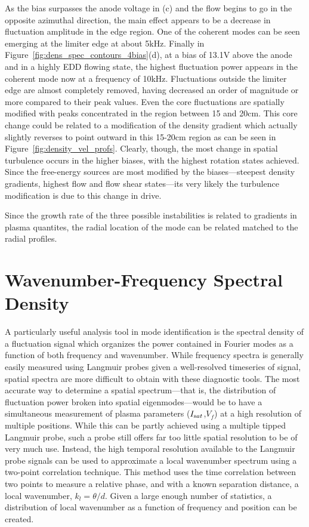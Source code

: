 \documentclass[aip,pop,amsmath,amssymb,reprint,superscriptaddress]{revtex4-1} %
\begin{document}
As the bias surpasses the anode voltage in (c) and the flow begins to go in the opposite azimuthal direction, the main effect appears to be a decrease in fluctuation amplitude in the edge region. One of the coherent modes can be seen emerging at the limiter edge at about 5kHz. Finally in Figure~\ref{fig:dens_spec_contours_4bias}(d), at a bias of 13.1V above the anode and in a highly EDD flowing state, the highest fluctuation power appears in the coherent mode now at a frequency of 10kHz. Fluctuations outside the limiter edge are almost completely removed, having decreased an order of magnitude or more compared to their peak values. Even the core fluctuations are spatially modified with peaks concentrated in the region between 15 and 20cm. This core change could be related to a modification of the density gradient which actually slightly reverses to point outward in this 15-20cm region as can be seen in Figure~\ref{fig:density_vel_profs}. Clearly, though, the most change in spatial turbulence occurs in the higher biases, with the highest rotation states achieved. Since the free-energy sources are most modified by the biases---steepest density gradients, highest flow and flow shear states---its very likely the turbulence modification is due to this change in drive.

Since the growth rate of the three possible instabilities is related to gradients in plasma quantites, the radial location of the mode can be related matched to the radial profiles.

\section{Wavenumber-Frequency Spectral Density}

A particularly useful analysis tool in mode identification is the spectral density of a fluctuation signal which organizes the power contained in Fourier modes as a function of both frequency and wavenumber. While frequency spectra is generally easily measured using Langmuir probes given a well-resolved timeseries of signal, spatial spectra are more difficult to obtain with these diagnostic tools. The most accurate way to determine a spatial spectrum---that is, the distribution of fluctuation power broken into spatial eigenmodes---would be to have a simultaneous measurement of plasma parameters ($I_{\text sat}$,$V_{f}$) at a high resolution of multiple positions. While this can be partly achieved using a multiple tipped Langmuir probe, such a probe still offers far too little spatial resolution to be of very much use.  Instead, the high temporal resolution available to the Langmuir probe signals can be used to approximate a local wavenumber spectrum using a two-point correlation technique. This method uses the time correlation between two points to measure a relative phase, and with a known separation distance, a local wavenumber, $k_{l} = \theta/d$. Given a large enough number of statistics, a distribution of local wavenumber as a function of frequency and position can be created.
\end{document}

